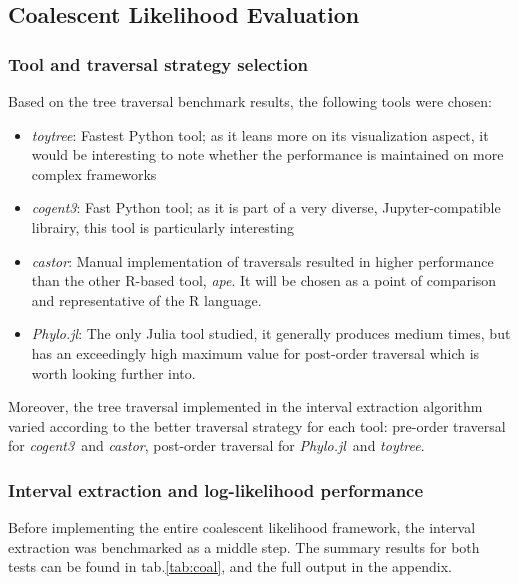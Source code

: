 \documentclass[11pt, a4paper]{article}
\newcommand{\ape}{\textit{ape}}
\newcommand{\cogent}{\textit{cogent3}}
\newcommand{\toytree}{\textit{toytree}}
\newcommand{\phylo}{\textit{Phylo.jl}}
\newcommand{\castor}{\textit{castor}}
\begin{document}
\subsection{Coalescent Likelihood Evaluation}

\subsubsection{Tool and traversal strategy selection}

Based on the tree traversal benchmark results, the following tools were chosen: 
\begin{itemize}
    \item \toytree: Fastest Python tool; as it leans more on its visualization aspect, it would be interesting to note whether the performance is maintained on more complex frameworks
    \item \cogent: Fast Python tool; as it is part of a very diverse, Jupyter-compatible librairy, this tool is particularly interesting 
    \item \castor: Manual implementation of traversals resulted in higher performance than the other R-based tool, \ape. It will be chosen as a point of comparison and representative of the R language.
    \item \phylo: The only Julia tool studied, it generally produces medium times, but has an exceedingly high maximum value for post-order traversal which is worth looking further into.
\end{itemize}

Moreover, the tree traversal implemented in the interval extraction algorithm varied according to the better traversal strategy for each tool: pre-order traversal for \cogent\ and \castor, post-order traversal for \phylo\ and \toytree. 

\subsubsection{Interval extraction and log-likelihood performance}

Before implementing the entire coalescent likelihood framework, the interval extraction was benchmarked as a middle step. The summary results for both tests can be found in tab.\ref{tab:coal}, and the full output in the appendix. 
\end{document}
